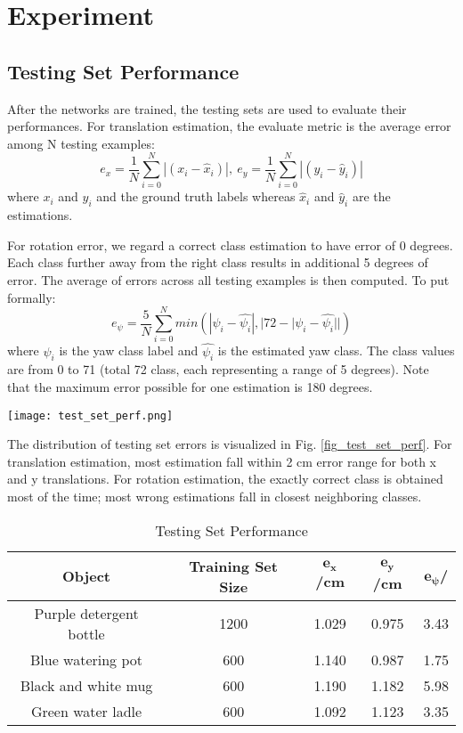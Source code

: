 \documentclass[conference]{IEEEtran}
\begin{document}
\section{Experiment}
\subsection{Testing Set Performance}
After the networks are trained, the testing sets are used to evaluate their performances. For translation estimation, the evaluate metric is the average error among N testing examples:
$$e_{x} = \frac{1}{N}\sum_{i=0}^{N}|(x_{i} - \hat{x}_{i})|,\
  e_{y} = \frac{1}{N}\sum_{i=0}^{N}|(y_{i} - \hat{y}_{i})|$$
where $x_{i}$ and $y_{i}$ and the ground truth labels whereas $\hat{x}_{i}$ and $\hat{y}_{i}$ are the estimations.

For rotation error, we regard a correct class estimation to have error of 0 degrees. Each class further away from the right class results in additional 5 degrees of error. The average of errors across all testing examples is then computed. To put formally:
$$e_{\psi} = \frac{5}{N}\sum_{i=0}^{N}min(
|\psi_{i} - \hat{\psi_{i}}|,
|72 - |\psi_{i} - \hat{\psi_{i}}||)$$
where $\psi_{i}$ is the yaw class label and $\hat{\psi_{i}}$ is the estimated yaw class. The class values are from 0 to 71 (total 72 class, each representing a range of 5 degrees). Note that the maximum error possible for one estimation is 180 degrees.

\begin{figure*}[t]
  \texttt{[image: test\_set\_perf.png]}
  \caption{Testing Set Performance}
  \label{fig_test_set_perf}
\end{figure*}
The distribution of testing set errors is visualized in Fig. \ref{fig_test_set_perf}. For translation estimation, most estimation fall within 2 cm error range for both x and y translations. For rotation estimation, the exactly correct class is obtained most of the time; most wrong estimations fall in closest neighboring classes.

\begin{table}[h]
\caption{Testing Set Performance}
\begin{center}
\begin{tabular}{|c|c|c|c|c|}
\hline
\textbf{Object}&\textbf{Training Set Size}&$\mathbf{e_{x}}$\textbf{/cm}&$\mathbf{e_{y}}$\textbf{/cm}&$\mathbf{e_{\psi}}$\textbf{/\textdegree} \\
\hline
Purple detergent bottle&1200&1.029&0.975&3.43 \\
\hline
Blue watering pot&600&1.140&0.987&1.75 \\
\hline
Black and white mug&600&1.190&1.182&5.98 \\
\hline
Green water ladle&600&1.092&1.123&3.35 \\
\hline
\end{tabular}
\label{tab_testing_set_perf}
\end{center}
\end{table}
\end{document}
